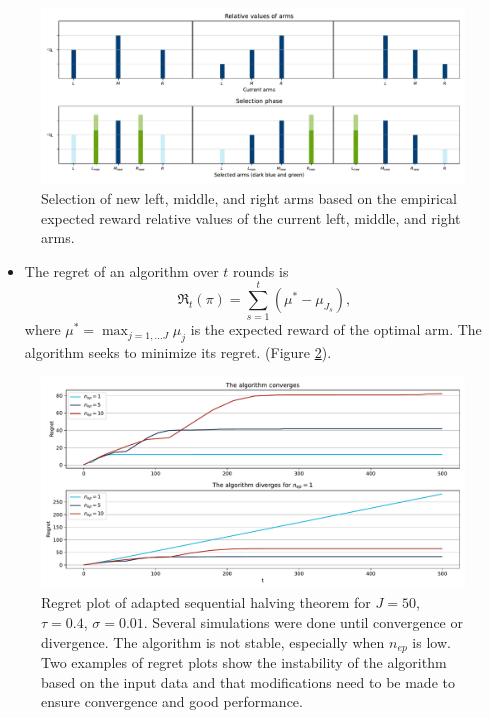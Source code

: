 \documentclass[
]{ImperialPoster}
\begin{document}
\begin{multicols}{2}
	\begin{figure}[H] %
		\includegraphics[width=\linewidth]{"../../../../figures/arm_assignment.pdf"} %
		\caption{Selection of new left, middle, and right arms based on the empirical expected reward relative values of the current left, middle, and right arms.}
		\label{fig:new_arms}
	\end{figure}
	\begin{itemize}
		\item The \textcolor{ICLBlue}{regret} of an algorithm over $t$ rounds is
		$$\mathfrak{R}_t(\pi) = \sum_{s=1}^{t}(\mu^* - \mu_{J_s}),$$
		where $\mu^* = \max_{j = 1, \dots J}\mu_j$ is the expected reward of the optimal arm. 
		The algorithm seeks to minimize its regret. (Figure \ref{fig:regret}).

	\end{itemize}
	\begin{figure}[H] %
		\includegraphics[width=\linewidth]{"../../../../figures/regret.pdf"} %
		\caption{Regret plot of adapted sequential halving theorem for $J = 50$, $\tau = 0.4$, $\sigma = 0.01$. Several simulations were done until convergence or divergence. The algorithm is not stable, especially when $n_{ep}$ is low.
		Two examples of regret plots show the instability of the algorithm based on the input data and 
		that modifications need to be made to ensure convergence and good performance.}
		\label{fig:regret}
	\end{figure}


\end{multicols}
\end{document}
